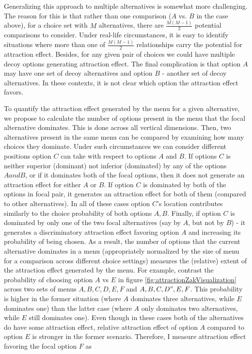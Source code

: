 \documentclass[a4paper,12pt]{article}
\begin{document}
Generalizing this approach to multiple alternatives is somewhat more challenging. The reason for this is that rather than one comparison ($A$ vs. $B$ in the case above), for a choice set with $M$ alternatives, there are $\frac{M(M-1)}{2}$ potential comparisons to consider. Under real-life circumstances, it is easy to identify situations where more than one of $\frac{M(M-1)}{2}$ relationships carry the potential for attraction effect. Besides, for any given pair of choices we could have multiple decoy options generating attraction effect. The final complication is that option $A$ may have one set of decoy alternatives and option $B$ - another set of decoy alternatives. In these contexts, it is not clear which option the attraction effect favors.

To quantify the attraction effect generated by the menu for a given alternative, we propose to calculate the number of options present in the menu that the focal alternative dominates. This is done across all vertical dimensions. Then, two alternatives present in the same menu can be compared by examining how many choices they dominate. Under such circumstances we can consider different positions option $C$ can take with respect to options $A$ and $B$. If options $C$ is neither superior (dominant) not inferior (dominated) by any of the options ${A and B}$, or if it dominates both of the focal options, then it does not generate an attraction effect for either $A$ or $B$. If option $C$ is dominated by both of the options in focal pair, it generates an attraction effect for both of them (compared to other alternatives). In all of these cases option $C$'s location contributes similarly to the choice probability of both options ${A, B}$.  Finally, if option $C$ is dominated by only one of the two focal alternatives (say by $A$, but not by $B$) - it generates a discriminatory attraction effect favoring option $A$ and increasing its probability of being chosen. As a result, the number of options that the current alternative dominates in a menu (appropriately normalized by the size of menu for a comparison across different choice settings) measures the (relative) extent of the attraction effect generated by the menu. For example, contrast the probability of choosing option $A$ vs $E$ in figure \ref{fig:attractionZakVisualization} across two sets of menus ${A, B, C, D, E, F}$ and ${A, B, C, D", E, F}$. This probability is higher in the former situation (where $A$ dominates three alternatives, while $E$ dominates one) than the latter case (where $A$ only dominates two alternatives, while $E$ still dominates one). Even though in these cases both of the alternatives do have some attraction effect, relative attraction effect of option $A$ compared to option $E$ is stronger in the former scenario.  Therefore, I measure attraction effect favoring the focal option $F$ as
\end{document}
